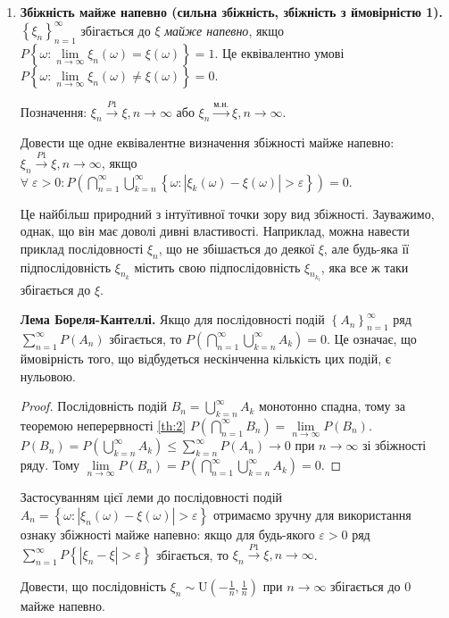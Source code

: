 \begin{enumerate}
    \item \textbf{Збіжність майже напевно (сильна збіжність, збіжність з ймовірністю 1).}
    \noindent$\left\{ \xi_n\right\}_{n=1}^{\infty}$ збігається до $\xi$ \emph{майже напевно}, якщо
    $P\left\{ \omega: \underset{n\to\infty}{\lim} \xi_n(\omega) = \xi(\omega)\right\} = 1$. 
    Це еквівалентно умові $P\left\{ \omega: \underset{n\to\infty}{\lim} \xi_n(\omega) \neq \xi(\omega)\right\} = 0$.

    Позначення: $\xi_n \overset{P1}{\longrightarrow} \xi, n \to \infty$ або $\xi_n \overset{\text{м.н.}}{\longrightarrow} \xi, n \to \infty$.
    \begin{exercise}
        Довести ще одне еквівалентне визначення збіжності майже напевно: $\xi_n \overset{P1}{\longrightarrow} \xi, n \to \infty$, якщо
        $\forall \; \varepsilon > 0: P\left( \bigcap\limits_{n=1}^{\infty} \bigcup\limits_{k = n}^{\infty}
        \left\{ \omega : \left| \xi_k(\omega) - \xi(\omega)\right| > \varepsilon\right\}\right) = 0$.
    \end{exercise}

    Це найбільш природний з інтуїтивної точки зору вид збіжності. Зауважимо, однак, що він має доволі дивні властивості. Наприклад, можна навести приклад
    послідовності $\xi_n$, що не збішається до деякої $\xi$, але будь-яка її підпослідовність $\xi_{n_k}$ містить свою підпослідовність
    $\xi_{n_{k_l}}$, яка все ж таки збігається до $\xi$.
    
    \textbf{Лема Бореля-Кантеллі.} Якщо для послідовності подій $\left\{A_n \right\}_{n=1}^{\infty}$ ряд
    $\sum\limits_{n=1}^{\infty} P(A_n)$ збігається, то $P\left( \bigcap\limits_{n=1}^{\infty} \bigcup\limits_{k = n}^{\infty} A_k\right) = 0$.
    Це означає, що ймовірність того, що відбудеться нескінченна кількість цих подій, є нульовою.
    \begin{proof}
        Послідовність подій $B_n = \bigcup\limits_{k = n}^{\infty} A_k$ монотонно спадна, тому за теоремою неперервності \ref{th:2}
        $P\left( \bigcap\limits_{n=1}^{\infty} B_n\right) = \underset{n\to\infty}{\lim} P(B_n)$.
        $P(B_n) = P\left( \bigcup\limits_{k = n}^{\infty} A_k\right) \leq \sum\limits_{k=n}^{\infty}P(A_n) \to 0$ при $n\to \infty$ 
        зі збіжності ряду. Тому $\underset{n\to\infty}{\lim} P(B_n) = P\left( \bigcap\limits_{n=1}^{\infty} \bigcup\limits_{k = n}^{\infty} A_k\right) = 0$.
    \end{proof}
    Застосуванням цієї леми до послідовності подій $A_n = \left\{ \omega : \left| \xi_n(\omega) - \xi(\omega)\right| > \varepsilon\right\}$ отримаємо зручну для використання
    ознаку збіжності майже напевно: якщо для будь-якого $\varepsilon >0$ ряд
    $\sum\limits_{n=1}^{\infty} P\left\{\left| \xi_n - \xi\right| > \varepsilon\right\}$ збігається, то 
    $\xi_n \overset{P1}{\longrightarrow} \xi, n \to \infty$.
    \begin{example}
        Довести, що послідовність $\xi_n \sim \mathrm{U}(-\frac{1}{n}, \frac{1}{n})$ при $n\to\infty$ збігається до 0 майже напевно.
        

\end{example}
\end{enumerate}
